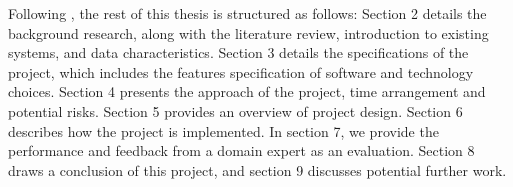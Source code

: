 Following \cite{Laramee2011}, the rest of this thesis is structured as follows: Section 2 details the background research, along with the literature review, introduction to existing systems, and data characteristics. Section 3 details the specifications of the project, which includes the features specification of software and technology choices. Section 4 presents the approach of the project, time arrangement and potential risks. Section 5 provides an overview of project design. Section 6 describes how the project is implemented. In section 7, we provide the performance and feedback from a domain expert as an evaluation. Section 8 draws a conclusion of this project, and section 9 discusses potential further work. 

